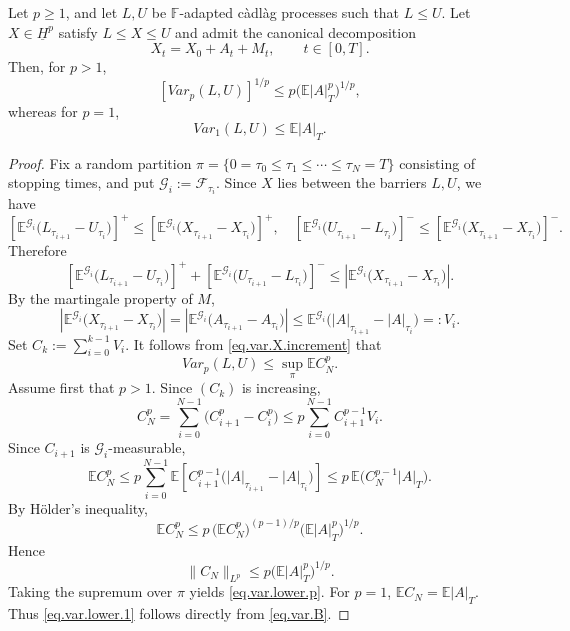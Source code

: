 \documentclass[10pt,a4paper]{amsart}
\begin{document}
\begin{proposition}\label{prop.var.lower}
Let $p\geq1$, and let $L,U$ be $\mathbb F$-adapted c\`adl\`ag processes such that
$L\leq U$. Let $X\in \underline H^p$ satisfy   $L\le X\le U$ and  admit  the canonical decomposition 
\[
X_t=X_0+A_t+M_t,\qquad t\in[0,T].
\]
Then, for $p>1$,
\begin{equation}\label{eq.var.lower.p}
[Var_p(L,U)]^{1/p}
\leq
p\big(\mathbb E|A|_T^p\big)^{1/p},
\end{equation}
whereas for $p=1$,
\begin{equation}\label{eq.var.lower.1}
Var_1(L,U)\leq \mathbb E|A|_T.
\end{equation}
\end{proposition}

\begin{proof}
Fix a random partition $\pi=\{0=\tau_0\leq\tau_1\leq\cdots\leq\tau_N=T\}$
consisting of stopping times, and put $\mathcal G_i:=\mathcal F_{\tau_i}$.
Since $X$ lies between the barriers $L,U$,  we have
\[
\left[\mathbb E^{\mathcal G_i}\big(L_{\tau_{i+1}}-U_{\tau_i}\big)\right]^+
\leq\left[\mathbb E^{\mathcal G_i}\big(X_{\tau_{i+1}}-X_{\tau_i}\big)\right]^+,\quad 
\left[
\mathbb E^{\mathcal G_i}
\big(U_{\tau_{i+1}}-L_{\tau_i}\big)
\right]^-
\leq
\left[
\mathbb E^{\mathcal G_i}
\big(X_{\tau_{i+1}}-X_{\tau_i}\big)
\right]^-.
\]
Therefore
\begin{equation}
\label{eq.var.X.increment}
\left[\mathbb E^{\mathcal G_i}\big(L_{\tau_{i+1}}-U_{\tau_i}\big)\right]^+
+\left[\mathbb E^{\mathcal G_i}\big(U_{\tau_{i+1}}-L_{\tau_i}\big)
\right]^-
\leq\left|\mathbb E^{\mathcal G_i}\big(X_{\tau_{i+1}}-X_{\tau_i}\big)\right|.
\end{equation}
By the martingale property of $M$,
\[
\left|\mathbb E^{\mathcal G_i}
\big(X_{\tau_{i+1}}-X_{\tau_i}\big)\right|
= 
\left|\mathbb E^{\mathcal G_i}
\big(A_{\tau_{i+1}}-A_{\tau_i}\big)\right|
\le 
\mathbb E^{\mathcal G_i}
\big(|A|_{\tau_{i+1}}-|A|_{\tau_i}\big)=:V_i.
\]
Set $C_k:=\sum_{i=0}^{k-1}V_i$.
It follows from \eqref{eq.var.X.increment} that
\begin{equation}\label{eq.var.B}
Var_p(L,U)
\leq
\sup_{\pi}\mathbb E C_N^p.
\end{equation}
Assume first that $p>1$. Since $(C_k)$ is increasing,
\[
C_N^p
=
\sum_{i=0}^{N-1}
\big(C_{i+1}^p-C_i^p\big)
\leq
p\sum_{i=0}^{N-1}C_{i+1}^{p-1}V_i.
\]
Since $C_{i+1}$ is $\mathcal G_i$-measurable,
\[
\mathbb E C_N^p\leq p\sum_{i=0}^{N-1} \mathbb E\left[C_{i+1}^{p-1}\big(|A|_{\tau_{i+1}}-|A|_{\tau_i}\big)\right]
\leq p\,\mathbb E\big(C_N^{p-1}|A|_T\big).
\]
By H\"older's inequality,
\[
\mathbb E C_N^p
\leq
p\,
\big(\mathbb E C_N^p\big)^{(p-1)/p}
\big(\mathbb E |A|_T^p\big)^{1/p}.
\]
Hence
\[
\|C_N\|_{L^p}
\leq
p\big(\mathbb E|A|_T^p\big)^{1/p}.
\]
Taking the supremum over $\pi$  yields
\eqref{eq.var.lower.p}.
For $p=1$, $\mathbb E C_N=\mathbb E|A|_T$.
Thus \eqref{eq.var.lower.1} follows directly from
\eqref{eq.var.B}.
\end{proof}
\end{document}
